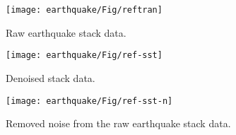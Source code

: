 \begin{figure}[htb!]
  \centering
  \texttt{[image: earthquake/Fig/reftran]}     
   \caption{Raw earthquake stack data. }
   \label{fig:reftran}
\end{figure}

\begin{figure}[htb!]
  \centering
  \texttt{[image: earthquake/Fig/ref-sst]}
       
   \caption{Denoised stack data. }
    \label{fig:ref-sst} 
\end{figure}

\begin{figure}[htb!]
  \centering
  \texttt{[image: earthquake/Fig/ref-sst-n]}
       
   \caption{Removed noise from the raw earthquake stack data.}
    \label{fig:ref-sst-n}  
\end{figure}


